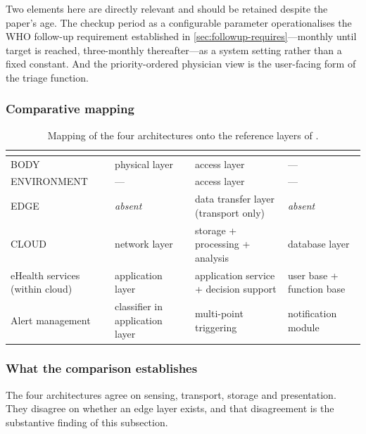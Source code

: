 \documentclass[12pt,a4paper,oneside]{report}
\begin{document}
Two elements here are directly relevant and should be retained despite the paper's age. The checkup period as a configurable parameter operationalises the WHO follow-up requirement established in \cref{sec:followup-requires}---monthly until target is reached, three-monthly thereafter---as a system setting rather than a fixed constant. And the priority-ordered physician view is the user-facing form of the triage function.

\subsubsection{Comparative mapping}

\begin{table}[htbp]
\centering\footnotesize
\caption{Mapping of the four architectures onto the reference layers of \textcite{mucchi2021}.}\label{tab:layer-mapping}
\begin{tabularx}{\textwidth}{@{}>{\raggedright\arraybackslash}p{3.0cm} >{\raggedright\arraybackslash}X >{\raggedright\arraybackslash}X >{\raggedright\arraybackslash}X@{}}
\toprule
\textbf{\textcite{mucchi2021}} & \textbf{\textcite{efendi2025}} & \textbf{\textcite{liu2025review}} & \textbf{\textcite{yazdani2018}} \\
\midrule
BODY & physical layer & access layer & --- \\
ENVIRONMENT & --- & access layer & --- \\
EDGE & \emph{absent} & data transfer layer (transport only) & \emph{absent} \\
CLOUD & network layer & storage + processing + analysis & database layer \\
eHealth services (within cloud) & application layer & application service + decision support & user base + function base \\
Alert management & classifier in application layer & multi-point triggering & notification module \\
\bottomrule
\end{tabularx}
\end{table}

\subsubsection{What the comparison establishes}

The four architectures agree on sensing, transport, storage and presentation. They disagree on whether an edge layer exists, and that disagreement is the substantive finding of this subsection.
\end{document}
